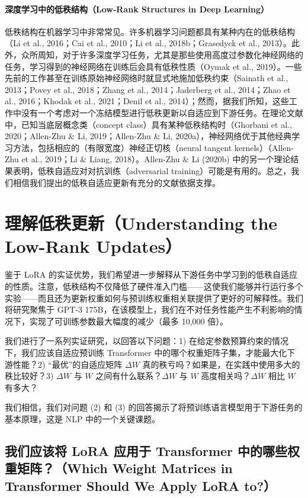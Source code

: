 \documentclass[11pt,UTF8,fontset=fandol]{ctexart}
\begin{document}
\paragraph{深度学习中的低秩结构（Low-Rank Structures in Deep Learning）}低秩结构在机器学习中非常常见。许多机器学习问题都具有某种内在的低秩结构（Li et al., 2016；Cai et al., 2010；Li et al., 2018b；Grasedyck et al., 2013）。此外，众所周知，对于许多深度学习任务，尤其是那些使用高度过参数化神经网络的任务，学习得到的神经网络在训练后会具有低秩性质（Oymak et al., 2019）。一些先前的工作甚至在训练原始神经网络时就显式地施加低秩约束（Sainath et al., 2013；Povey et al., 2018；Zhang et al., 2014；Jaderberg et al., 2014；Zhao et al., 2016；Khodak et al., 2021；Denil et al., 2014）；然而，据我们所知，这些工作中没有一个考虑对一个冻结模型进行低秩更新以自适应到下游任务。在理论文献中，已知当底层概念类（concept class）具有某种低秩结构时（Ghorbani et al., 2020；Allen-Zhu \& Li, 2019；Allen-Zhu \& Li, 2020a），神经网络优于其他经典学习方法，包括相应的（有限宽度）神经正切核（neural tangent kernels）（Allen-Zhu et al., 2019；Li \& Liang, 2018）。Allen-Zhu \& Li (2020b) 中的另一个理论结果表明，低秩自适应对对抗训练（adversarial training）可能是有用的。总之，我们相信我们提出的低秩自适应更新有充分的文献依据支撑。

\section{理解低秩更新（Understanding the Low-Rank Updates）}

鉴于 LoRA 的实证优势，我们希望进一步解释从下游任务中学习到的低秩自适应的性质。注意，低秩结构不仅降低了硬件准入门槛——这使我们能够并行运行多个实验——而且还为更新权重如何与预训练权重相关联提供了更好的可解释性。我们将研究聚焦于 GPT-3 175B，在该模型上，我们在不对任务性能产生不利影响的情况下，实现了可训练参数最大幅度的减少（最多 10{,}000 倍）。

我们进行了一系列实证研究，以回答以下问题：1) 在给定参数预算约束的情况下，我们应该自适应预训练 Transformer 中的哪个权重矩阵子集，才能最大化下游性能？2) “最优”的自适应矩阵 $\Delta W$ 真的秩亏吗？如果是，在实践中使用多大的秩比较好？3) $\Delta W$ 与 $W$ 之间有什么联系？$\Delta W$ 与 $W$ 高度相关吗？$\Delta W$ 相比 $W$ 有多大？

我们相信，我们对问题 (2) 和 (3) 的回答揭示了将预训练语言模型用于下游任务的基本原理，这是 NLP 中的一个关键课题。

\subsection{我们应该将 LoRA 应用于 Transformer 中的哪些权重矩阵？（Which Weight Matrices in Transformer Should We Apply LoRA to?）}
\end{document}
